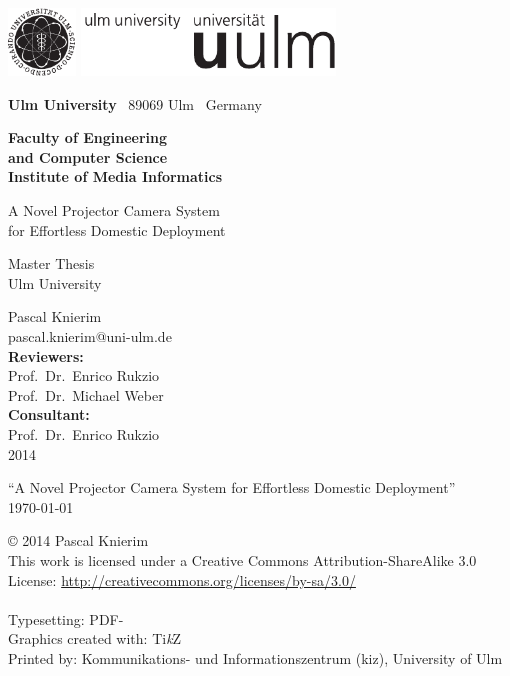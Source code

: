 \documentclass[
    a4paper,
    10pt,
    bibliography=totoc,
    twoside,
    openright,
    numbers=noenddot,
    headings=normal,
    DIV=9,
    BCOR=7mm
    ,parskip
]{scrbook}
\makeatletter
\newcommand{\fullname}{Pascal Knierim}
\newcommand{\email}{pascal.knierim@uni-ulm.de}
\newcommand{\titel}{A Novel Projector Camera System for Effortless Domestic Deployment}
\newcommand{\jahr}{2014}
\newcommand{\gutachterA}{Prof.\ Dr.\ Enrico Rukzio}
\newcommand{\gutachterB}{Prof.\ Dr.\ Michael Weber} %
\newcommand{\betreuer}{Prof.\ Dr.\ Enrico Rukzio}
\newcommand{\fakultaet}{Engineering\\and Computer Science}
\newcommand{\institut}{Institute of Media Informatics}
\newcommand{\arbeit}{Master Thesis}
\makeatother
\begin{document}
\frontmatter

\thispagestyle{empty}

\begin{addmargin*}[4mm]{-32mm}
    \includegraphics[height=1.8cm]{images/uni_logo/uni_bild}
    \hfill
    \includegraphics[height=1.8cm]{images/uni_logo/uni_wort}
    \vspace*{2.1em}
    \footnotesize
    {\selectfont
    
    \textbf{Ulm University} \textbar ~89069 Ulm \textbar ~Germany
    \hfill
    \parbox[t]{42mm}{\bfseries Faculty of \fakultaet\\\mdseries\institut}
    \vspace*{2cm}

    \parbox{140mm}{\bfseries \raggedright \huge A Novel Projector Camera System\\ for Effortless Domestic Deployment}

    {\arbeit{}\\Ulm University}
    \vspace*{4em}

    \fullname\\\email\\[2em]
    \textbf{Reviewers:}\\\gutachterA\\\gutachterB\\[2em]
    \textbf{Consultant:}\\\betreuer\\[1.5em]
    \jahr}
\end{addmargin*}


\clearpage
\thispagestyle{empty}
{
    \small \flushleft \enquote{\titel}\\
    \today
    \vfill

    \copyright{} \jahr{} \fullname{}\\[0.5em]
    This work is licensed under a Creative Commons Attribution-ShareAlike 3.0 License: \url{http://creativecommons.org/licenses/by-sa/3.0/}\\
    \ccbysa\\
    \vspace{0.5cm}
    Typesetting: PDF-\LaTeXe{}\\
    Graphics created with: Ti\textit{k}Z\\
    Printed by: Kommunikations- und Informationszentrum (kiz), University of Ulm
}
\end{document}
